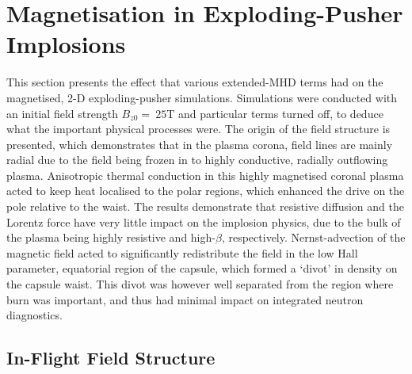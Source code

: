 \section{Magnetisation in Exploding-Pusher Implosions}%
\label{sec:Res2_mag_unmag}

This section presents the effect that various extended-\ac{MHD} terms had on the magnetised, 2-D exploding-pusher simulations.
Simulations were conducted with an initial field strength $B_{z0}=\ 25\text{T}$ and particular terms turned off, to deduce what the important physical processes were.
The origin of the field structure is presented, which demonstrates that in the plasma corona, field lines are mainly radial due to the field being frozen in to highly conductive, radially outflowing plasma.
Anisotropic thermal conduction in this highly magnetised coronal plasma acted to keep heat localised to the polar regions, which enhanced the drive on the pole relative to the waist.
The results demonstrate that resistive diffusion and the Lorentz force have very little impact on the implosion physics, due to the bulk of the plasma being highly resistive and high-$\beta$, respectively.
Nernst-advection of the magnetic field acted to significantly redistribute the field in the low Hall parameter, equatorial region of the capsule, which formed a `divot' in density on the capsule waist.
This divot was however well separated from the region where burn was important, and thus had minimal impact on integrated neutron diagnostics.

\subsection{In-Flight Field Structure}%
\label{sec:Res2_field_structure}


